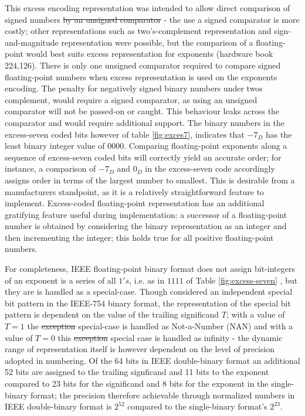 \documentclass[7pt]{article}
\begin{document}
This excess encoding representation was intended to allow direct comparison of signed numbers \st{by an unsigned comparator} - the use a signed comparator is more costly; other representations such as two's-complement representation and sign-and-magnitude representation were possible, but the comparison of a floating-point would best suits excess representation for exponents (hardware book 224,126). There is only one unsigned comparator required to compare signed floating-point numbers when excess representation is used on the exponents encoding. The penalty for negatively signed binary numbers under twos complement, would require a signed comparator, as  using an unsigned comparator will not be passed-on or caught. This behaviour leaks across the comparator and would require additional support. The binary numbers in the excess-seven coded bits however of table \ref{fig:exces7}, indicates that $-7_D$ has the least binary integer value of $0000$.  Comparing floating-point exponents along a sequence of excess-seven coded bits will correctly yield an accurate order; for instance, a comparison of  $-7_D$ and $0_D$ in the excess-seven code accordingly assigns order in terms of the largest number to  smallest. This is desirable from a manufacturers standpoint, as it is a relatively straightforward feature to implement. Excess-coded floating-point representation has an additional gratifying feature useful during implementation: a successor of a floating-point number is obtained by considering the binary representation as an integer and then incrementing the integer; this holds true for all positive floating-point numbers.

For completeness, IEEE floating-point binary format does not assign bit-integers of an exponent is a series of all $1's$,  i.e. as in $1111$ of Table  \ref{fig:excess-seven} , but they are is handled as a special-case. Though considered  an independent special bit pattern in the IEEE-754 binary format, the representation of the special bit pattern is dependent on the value of the trailing significand $T$; with a value of $T=1$ the \st{exception} special-case is handled as Not-a-Number (NAN) and  with a value of $T=0$ this \st{exception} special case is handled as infinity - the dynamic range of representation itself is however dependent on the level of precision adopted in numbering. Of the 64 bits in IEEE double-binary format an additional 52 bits are assigned to the trailing signficand and 11 bits to the exponent compared to 23 bits for the significand and 8 bits for the exponent in the single-binary format; the precision therefore achievable through normalized numbers in IEEE double-binary format is $2^{52}$ compared to the single-binary format's $2^{23}$.
\end{document}

